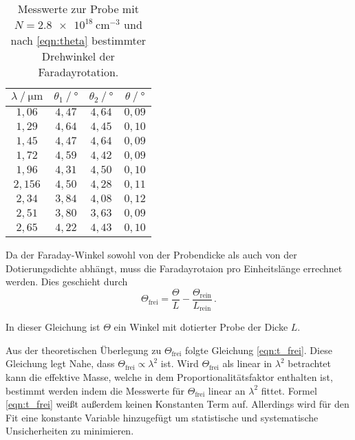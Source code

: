\begin{table}
              \centering
              \caption{Messwerte zur Probe mit $N = \qty{2.8e18}{\centi\metre^{-3}}$ und nach \autoref{eqn:theta} bestimmter Drehwinkel der Faradayrotation.}
              \label{tab:mw3}
              \begin{tabular}{c c c c}
                \toprule
                $\lambda \mathbin{/} \unit{\micro\meter}$ & $\theta_{1} \mathbin{/} \unit{\degree}$ & $\theta_{2} \mathbin{/} \unit{\degree}$ &%
                 $\theta \mathbin{/} \unit{\degree}$ \\
                \midrule
                $1,06 $ & $4,47$ & $4,64$ & $0,09$ \\
                $1,29 $ & $4,64$ & $4,45$ & $0,10$ \\
                $1,45 $ & $4,47$ & $4,64$ & $0,09$ \\
                $1,72 $ & $4,59$ & $4,42$ & $0,09$ \\
                $1,96 $ & $4,31$ & $4,50$ & $0,10$ \\
                $2,156$ & $4,50$ & $4,28$ & $0,11$ \\
                $2,34 $ & $3,84$ & $4,08$ & $0,12$ \\
                $2,51 $ & $3,80$ & $3,63$ & $0,09$ \\
                $2,65 $ & $4,22$ & $4,43$ & $0,10$ \\
                \bottomrule
              \end{tabular}
\end{table}

Da der Faraday-Winkel sowohl von der Probendicke als auch von der Dotierungsdichte abhängt, muss die Faradayrotaion pro Einheitslänge errechnet werden. Dies geschieht durch 
\begin{equation}
              \Theta_\mathrm{frei} = \frac{\Theta}{L} - \frac{\Theta_\mathrm{rein}}{L_\mathrm{rein}} \,.
\end{equation} 

In dieser Gleichung ist $\Theta$ ein Winkel mit dotierter Probe der Dicke $L$.

Aus der theoretischen Überlegung zu $\Theta_\mathrm{frei}$ folgte Gleichung \eqref{eqn:t_frei}. Diese Gleichung legt Nahe, dass $\Theta_\mathrm{frei} \propto \lambda^2$ ist. 
Wird $\Theta_\mathrm{frei}$ als linear in $\lambda^2$ betrachtet kann die effektive Masse, welche in dem Proportionalitätsfaktor enthalten ist, bestimmt werden indem die Messwerte für 
$\Theta_\mathrm{frei}$ linear an $\lambda^2$ fittet. Formel \eqref{eqn:t_frei} weißt außerdem keinen Konstanten Term auf. Allerdings wird für den Fit eine konstante Variable hinzugefügt
um statistische und systematische Unsicherheiten zu minimieren.

